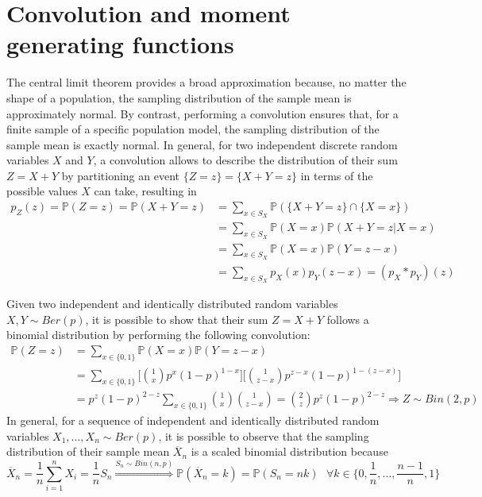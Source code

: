 \documentclass{report}
\begin{document}
\section{Convolution and moment generating functions}
The central limit theorem provides a broad approximation because, no matter the shape of a population, the sampling distribution of the sample mean is approximately normal. \newline
By contrast, performing a convolution ensures that, for a finite sample of a specific population model, the sampling distribution of the sample mean is exactly normal. \newline
In general, for two independent discrete random variables $\displaystyle X$ and $\displaystyle Y$, a convolution allows to describe the distribution of their sum $\displaystyle Z = X + Y$ by partitioning an event $\displaystyle \{Z = z\} = \{X + Y = z\}$ in terms of the possible values $\displaystyle X$ can take, resulting in
\begin{align*}
    p_Z(z) = \mathbb{P}(Z = z) = \mathbb{P}(X + Y = z)
        &= \sum_{x \in S_X} \mathbb{P}(\{X + Y = z\} \cap \{X = x\}) \\
        &= \sum_{x \in S_X} \mathbb{P}(X = x)\mathbb{P}(X + Y = z|X = x) \\
        &= \sum_{x \in S_X} \mathbb{P}(X = x)\mathbb{P}(Y = z - x) \\
        &= \sum_{x \in S_X} p_X(x)p_Y(z - x) = (p_X * p_Y)(z)
\end{align*}
\begin{examplebox}
    Given two independent and identically distributed random variables $\displaystyle X, Y \sim Ber(p)$, it is possible to show that their sum $\displaystyle Z = X + Y$ follows a binomial distribution by performing the following convolution:
    \begin{align*}
        \mathbb{P}(Z = z)
            &= \sum_{x \in \{0, 1\}} \mathbb{P}(X = x)\mathbb{P}(Y = z - x) \\
            &= \sum_{x \in \{0, 1\}} \Bigg[\binom{1}{x} p^x(1 - p)^{1 - x}\Bigg]\Bigg[\binom{1}{z - x} p^{z - x}(1 - p)^{1 - (z - x)}\Bigg] \\
            &= p^z(1 - p)^{2 - z}\sum_{x \in \{0, 1\}} \binom{1}{x}\binom{1}{z - x} = \binom{2}{z}p^z(1 - p)^{2 - z} \Rightarrow Z \sim Bin(2, p)
    \end{align*}
    In general, for a sequence of independent and identically distributed random variables $\displaystyle X_1, \dots, X_n \sim Ber(p)$, it is possible to observe that the sampling distribution of their sample mean $\displaystyle \overline{X}_n$ is a scaled binomial distribution because
    \[\overline{X}_n = \frac{1}{n}\sum_{i = 1}^n X_i = \frac{1}{n}S_n \stackrel{S_n \sim Bin(n, p)}{\Rightarrow} \mathbb{P}(\overline{X}_n = k) = \mathbb{P}(S_n = nk) \text{ } \forall k \in \Bigg\{0, \frac{1}{n}, \dots, \frac{n - 1}{n}, 1\Bigg\}\]
\end{examplebox}
\end{document}
